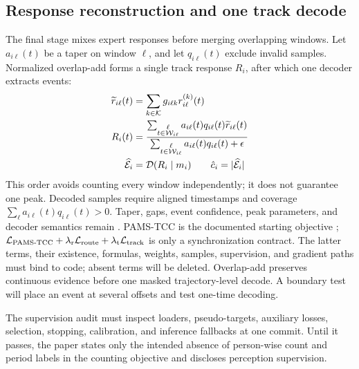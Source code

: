 \subsection{Response reconstruction and one track decode}
The final stage mixes expert responses before merging overlapping windows. Let
$a_{i\ell}(t)$ be a taper on window \(\ell\), and let
$q_{i\ell}(t)$ exclude invalid samples. Normalized overlap-add forms a single
track response $R_i$, after which one decoder extracts events:
\begin{equation}
\begin{aligned}
 \widetilde{r}_{i\ell}(t) &=
 \sum_{k\in\mathcal{K}}g_{i\ell k}r^{(k)}_{i\ell}(t) \\
 R_i(t) &=
 \frac{\sum_{\substack{\ell\\t\in\mathcal{W}_{i\ell}}}
 a_{i\ell}(t)q_{i\ell}(t)\widetilde{r}_{i\ell}(t)}
 {\sum_{\substack{\ell\\t\in\mathcal{W}_{i\ell}}}
 a_{i\ell}(t)q_{i\ell}(t)+\epsilon} \\
 \widehat{\mathcal{E}}_i &= \mathcal{D}(R_i\mid m_i)\qquad
 \hat c_i=|\widehat{\mathcal{E}}_i|
\end{aligned}
\label{eq:reconstruction}
\end{equation}
\noindent This order avoids counting every window independently; it does not
guarantee one peak. Decoded samples require aligned timestamps and coverage
$\sum_\ell a_{i\ell}(t)q_{i\ell}(t)>0$. Taper, gaps, event confidence, peak
parameters, and decoder semantics remain . PAMS-TCC is the documented starting objective \cite{gao2026pams};
$\mathcal{L}_{\mathrm{PAMS\text{-}TCC}}+\lambda_{\mathrm r}\mathcal{L}_{\mathrm{route}}
+\lambda_{\mathrm t}\mathcal{L}_{\mathrm{track}}$ is only a synchronization contract.
The latter terms, their existence, formulas, weights, samples, supervision, and
gradient paths must bind to code; absent terms will be deleted. Overlap-add
preserves continuous evidence before one masked trajectory-level decode. A
boundary test will place an event at several offsets and test one-time decoding.

The supervision audit must inspect loaders, pseudo-targets, auxiliary losses,
selection, stopping, calibration, and inference fallbacks at one commit. Until
it passes, the paper states only the intended absence of person-wise count and
period labels in the counting objective and discloses perception supervision.
